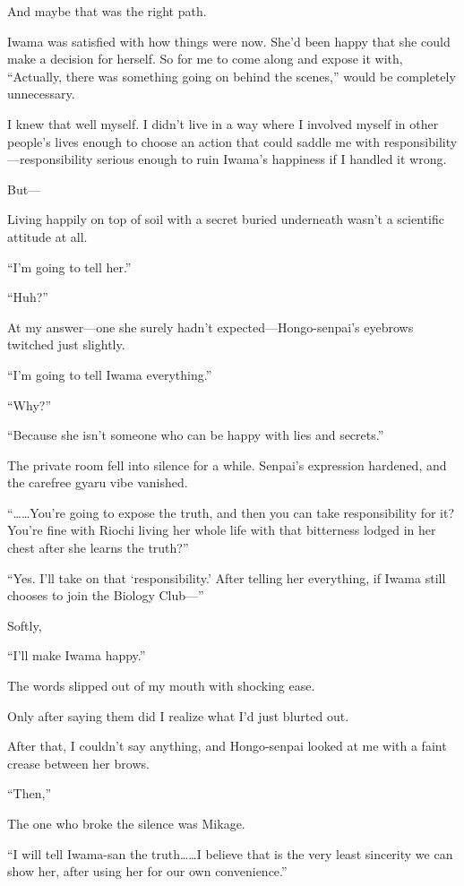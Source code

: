\documentclass[
    a4paper,
    12pt,
    twoside,
    openany,
    UTF8,
    fontset=windows
]{ctexbook}
\begin{document}
And maybe that was the right path.

Iwama was satisfied with how things were now. She'd been happy that she could make a decision for herself. So for me to come along and expose it with, ``Actually, there was something going on behind the scenes,'' would be completely unnecessary.

I knew that well myself. I didn't live in a way where I involved myself in other people's lives enough to choose an action that could saddle me with responsibility---responsibility serious enough to ruin Iwama's happiness if I handled it wrong.

But---

Living happily on top of soil with a secret buried underneath wasn't a scientific attitude at all.

``I'm going to tell her.''

``Huh?''

At my answer---one she surely hadn't expected---Hongo-senpai's eyebrows twitched just slightly.

``I'm going to tell Iwama everything.''

``Why?''

``Because she isn't someone who can be happy with lies and secrets.''

The private room fell into silence for a while. Senpai's expression hardened, and the carefree gyaru vibe vanished.

``\dots\dots You're going to expose the truth, and then you can take responsibility for it? You're fine with Riochi living her whole life with that bitterness lodged in her chest after she learns the truth?''

``Yes. I'll take on that `responsibility.' After telling her everything, if Iwama still chooses to join the Biology Club---''

Softly,

``I'll make Iwama happy.''

The words slipped out of my mouth with shocking ease.

Only after saying them did I realize what I'd just blurted out.

After that, I couldn't say anything, and Hongo-senpai looked at me with a faint crease between her brows.

``Then,''

The one who broke the silence was Mikage.

``I will tell Iwama-san the truth\dots\dots I believe that is the very least sincerity we can show her, after using her for our own convenience.''
\end{document}
